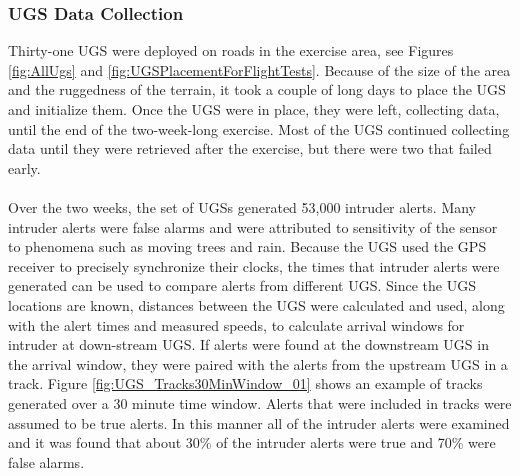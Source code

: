 \documentclass[letterpaper, 12 pt, conference]{ieeeconf}  %
\theoremstyle{definition}
\begin{document}
\subsubsection{UGS Data Collection}
Thirty-one UGS were deployed on roads in the exercise area, see Figures \ref{fig:AllUgs} and \ref{fig:UGSPlacementForFlightTests}. Because of the size of the area and the ruggedness of the terrain, it took a couple of long days to place the UGS and initialize them. Once the UGS were in place, they were left, collecting data, until the end of the two-week-long exercise. Most of the UGS continued collecting data until they were retrieved after the exercise, but there were two that failed early.\\\\
Over the two weeks, the set of UGSs generated 53,000 intruder alerts. Many intruder alerts were false alarms and were attributed to sensitivity of the sensor to phenomena such as moving trees and rain. Because the UGS used the GPS receiver to precisely synchronize their clocks, the times that intruder alerts were generated can be used to compare alerts from different UGS. Since the UGS locations are known, distances between the UGS were calculated and used, along with the alert times and measured speeds, to calculate arrival windows for intruder at down-stream UGS. If alerts were found at the downstream UGS in the arrival window, they were paired with the alerts from the upstream UGS in a track. Figure \ref{fig:UGS_Tracks30MinWindow_01} shows an example of tracks generated over a 30 minute time window.  Alerts that were included in tracks were assumed to be true alerts. In this manner all of the intruder alerts were examined and it was found that about 30\% of the intruder alerts were true and 70\% were false alarms. 
\end{document}
